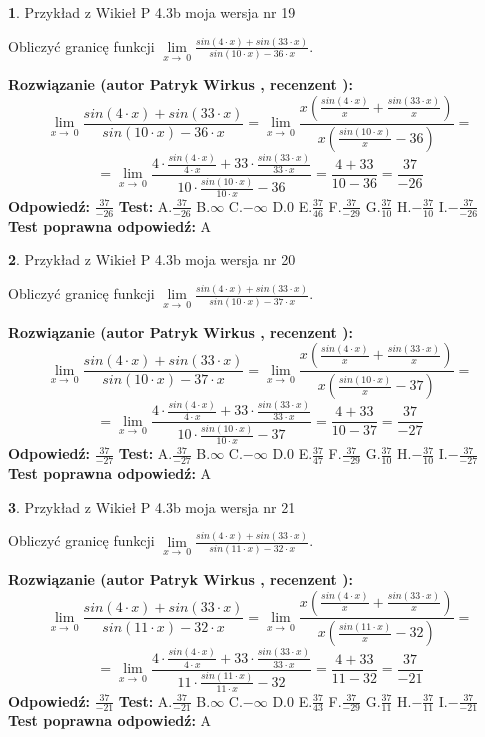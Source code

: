 \documentclass[12pt, a4paper]{article}
\theoremstyle{definition} %
\newtheorem{zad}{}
\newcommand{\zadStart}[1]{\begin{zad}#1\newline}
\newcommand{\zadStop}{\end{zad}}
\newcommand{\rozwStart}[2]{\noindent \textbf{Rozwiązanie (autor #1 , recenzent #2): }\newline}
\newcommand{\rozwStop}{\newline}
\newcommand{\odpStart}{\noindent \textbf{Odpowiedź:}\newline}
\newcommand{\odpStop}{\newline}
\newcommand{\testStart}{\noindent \textbf{Test:}\newline}
\newcommand{\testStop}{\newline}
\newcommand{\kluczStart}{\noindent \textbf{Test poprawna odpowiedź:}\newline}
\newcommand{\kluczStop}{\newline}
\begin{document}
\zadStart{Przykład z Wikieł P 4.3b moja wersja nr 19}


Obliczyć granicę funkcji $\lim\limits_{x\to\ 0}\frac{sin(4 \cdot x)+sin(33 \cdot x)}{sin(10 \cdot x)-36 \cdot x}$.
\zadStop
\rozwStart{Patryk Wirkus}{}
$$\lim\limits_{x\to\ 0}\frac{sin(4 \cdot x)+sin(33 \cdot x)}{sin(10 \cdot x)-36 \cdot x}=\lim\limits_{x\to\ 0}\frac{x(\frac{sin(4 \cdot x)}{x}+\frac{sin(33 \cdot x)}{x})}{x(\frac{sin(10 \cdot x)}{x}-36)}=$$
$$=\lim\limits_{x\to\ 0}\frac{4 \cdot \frac{sin(4 \cdot x)}{4 \cdot x}+33 \cdot \frac{sin(33 \cdot x)}{33 \cdot x}}{10 \cdot \frac{sin(10 \cdot x)}{10 \cdot x}-36}=\frac{4+33}{10-36} = \frac{37}{-26}$$
\rozwStop
\odpStart
$\frac{37}{-26}$
\odpStop
\testStart
A.$\frac{37}{-26}$
B.$\infty$
C.$-\infty$
D.$0$
E.$\frac{37}{46}$
F.$\frac{37}{-29}$
G.$\frac{37}{10}$
H.$-\frac{37}{10}$
I.$-\frac{37}{-26}$
\testStop
\kluczStart
A
\kluczStop



\zadStart{Przykład z Wikieł P 4.3b moja wersja nr 20}


Obliczyć granicę funkcji $\lim\limits_{x\to\ 0}\frac{sin(4 \cdot x)+sin(33 \cdot x)}{sin(10 \cdot x)-37 \cdot x}$.
\zadStop
\rozwStart{Patryk Wirkus}{}
$$\lim\limits_{x\to\ 0}\frac{sin(4 \cdot x)+sin(33 \cdot x)}{sin(10 \cdot x)-37 \cdot x}=\lim\limits_{x\to\ 0}\frac{x(\frac{sin(4 \cdot x)}{x}+\frac{sin(33 \cdot x)}{x})}{x(\frac{sin(10 \cdot x)}{x}-37)}=$$
$$=\lim\limits_{x\to\ 0}\frac{4 \cdot \frac{sin(4 \cdot x)}{4 \cdot x}+33 \cdot \frac{sin(33 \cdot x)}{33 \cdot x}}{10 \cdot \frac{sin(10 \cdot x)}{10 \cdot x}-37}=\frac{4+33}{10-37} = \frac{37}{-27}$$
\rozwStop
\odpStart
$\frac{37}{-27}$
\odpStop
\testStart
A.$\frac{37}{-27}$
B.$\infty$
C.$-\infty$
D.$0$
E.$\frac{37}{47}$
F.$\frac{37}{-29}$
G.$\frac{37}{10}$
H.$-\frac{37}{10}$
I.$-\frac{37}{-27}$
\testStop
\kluczStart
A
\kluczStop



\zadStart{Przykład z Wikieł P 4.3b moja wersja nr 21}


Obliczyć granicę funkcji $\lim\limits_{x\to\ 0}\frac{sin(4 \cdot x)+sin(33 \cdot x)}{sin(11 \cdot x)-32 \cdot x}$.
\zadStop
\rozwStart{Patryk Wirkus}{}
$$\lim\limits_{x\to\ 0}\frac{sin(4 \cdot x)+sin(33 \cdot x)}{sin(11 \cdot x)-32 \cdot x}=\lim\limits_{x\to\ 0}\frac{x(\frac{sin(4 \cdot x)}{x}+\frac{sin(33 \cdot x)}{x})}{x(\frac{sin(11 \cdot x)}{x}-32)}=$$
$$=\lim\limits_{x\to\ 0}\frac{4 \cdot \frac{sin(4 \cdot x)}{4 \cdot x}+33 \cdot \frac{sin(33 \cdot x)}{33 \cdot x}}{11 \cdot \frac{sin(11 \cdot x)}{11 \cdot x}-32}=\frac{4+33}{11-32} = \frac{37}{-21}$$
\rozwStop
\odpStart
$\frac{37}{-21}$
\odpStop
\testStart
A.$\frac{37}{-21}$
B.$\infty$
C.$-\infty$
D.$0$
E.$\frac{37}{43}$
F.$\frac{37}{-29}$
G.$\frac{37}{11}$
H.$-\frac{37}{11}$
I.$-\frac{37}{-21}$
\testStop
\kluczStart
A
\kluczStop
\end{document}
